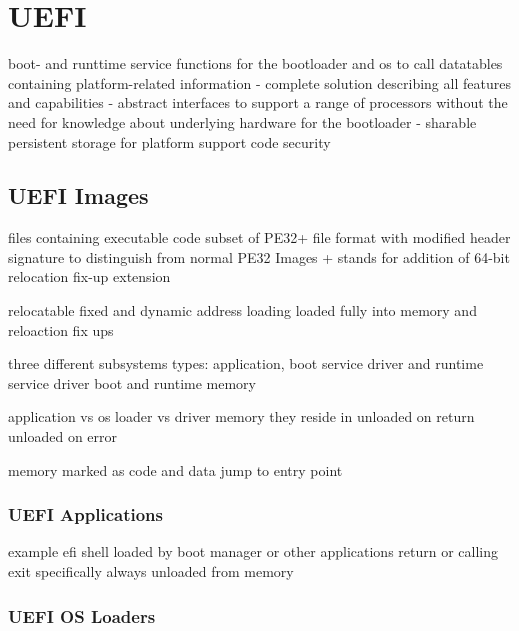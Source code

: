
\section{\acf{UEFI}}

boot- and runttime service functions for the bootloader and os to call
datatables containing platform-related information
- complete solution describing all features and capabilities
- abstract interfaces to support a range of processors without the need for knowledge about underlying hardware for the bootloader
- sharable persistent storage for platform support code
security


\subsection{\acs{UEFI} Images}


files containing executable code
subset of PE32+ file format with modified header signature to distinguish from normal PE32 Images
+ stands for addition of 64-bit relocation fix-up extension

relocatable
fixed and dynamic address loading
loaded fully into memory and reloaction fix ups

three different subsystems types: application, boot service driver and runtime service driver
boot and runtime memory

application vs os loader vs driver
memory they reside in
unloaded on return
unloaded on error

memory marked as code and data
jump to entry point

\subsubsection{\acs{UEFI} Applications}


example efi shell
loaded by boot manager or other applications
return or calling exit specifically
always unloaded from memory

\subsubsection{UEFI OS Loaders}

